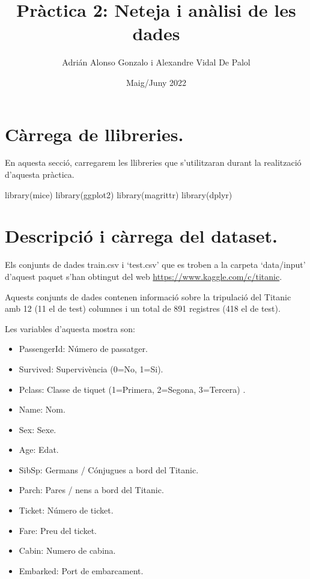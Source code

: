 \documentclass[
]{article}
\title{Pràctica 2: Neteja i anàlisi de les dades}
\author{Adrián Alonso Gonzalo i Alexandre Vidal De Palol}
\date{Maig/Juny 2022}
\newenvironment{Shaded}{\begin{snugshade}}{\end{snugshade}}
\newcommand{\FunctionTok}[1]{\textcolor[rgb]{0.94,0.94,0.56}{#1}}
\newcommand{\NormalTok}[1]{\textcolor[rgb]{0.80,0.80,0.80}{#1}}
\providecommand{\tightlist}{%
  \setlength{\itemsep}{0pt}\setlength{\parskip}{0pt}}
\begin{document}
\maketitle

{
\setcounter{tocdepth}{2}
\tableofcontents
}
\hypertarget{cuxe0rrega-de-llibreries.}{%
\section{Càrrega de llibreries.}\label{cuxe0rrega-de-llibreries.}}

En aquesta secció, carregarem les llibreries que s'utilitzaran durant la
realització d'aquesta pràctica.

\begin{Shaded}
\begin{Highlighting}[]
\FunctionTok{library}\NormalTok{(mice)}
\FunctionTok{library}\NormalTok{(ggplot2)}
\FunctionTok{library}\NormalTok{(magrittr)}
\FunctionTok{library}\NormalTok{(dplyr)}
\end{Highlighting}
\end{Shaded}

\hypertarget{descripciuxf3-i-cuxe0rrega-del-dataset.}{%
\section{Descripció i càrrega del
dataset.}\label{descripciuxf3-i-cuxe0rrega-del-dataset.}}

Els conjunts de dades train.csv i `test.csv' que es troben a la carpeta
`data/input' d'aquest paquet s'han obtingut del web
\url{https://www.kaggle.com/c/titanic}.

Aquests conjunts de dades contenen informació sobre la tripulació del
Titanic amb 12 (11 el de test) columnes i un total de 891 registres (418
el de test).

Les variables d'aquesta mostra son:

\begin{itemize}
\tightlist
\item
  PassengerId: Número de passatger.
\item
  Survived: Supervivència (0=No, 1=Si).
\item
  Pclass: Classe de tiquet (1=Primera, 2=Segona, 3=Tercera) .
\item
  Name: Nom.
\item
  Sex: Sexe.
\item
  Age: Edat.
\item
  SibSp: Germans / Cónjugues a bord del Titanic.
\item
  Parch: Pares / nens a bord del Titanic.
\item
  Ticket: Número de ticket.
\item
  Fare: Preu del ticket.
\item
  Cabin: Numero de cabina.
\item
  Embarked: Port de embarcament.
\end{itemize}
\end{document}
